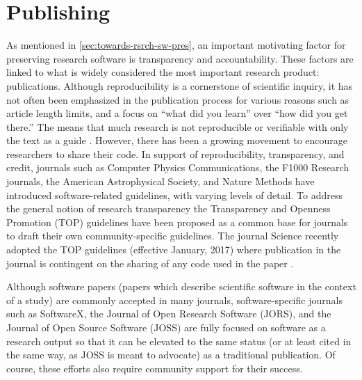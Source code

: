 \documentclass[letterpaper,11pt]{article}
\begin{document}
\section{Publishing}
As mentioned in \cref{sec:towards-rsrch-sw-pres}, an important motivating factor for preserving research software is transparency and accountability. These factors are linked to what is widely considered the most important research product: publications. Although reproducibility is a cornerstone of scientific inquiry, it has not often been emphasized in the publication process for various reasons such as article length limits, and a focus on ``what did you learn'' over ``how did you get there.'' The means that much research is not reproducible or verifiable with only the text as a guide \citep{stodden2014}. However, there has been a growing movement to encourage researchers to share their code. In support of reproducibility, transparency, and credit, journals such as Computer Physics Communications, the F1000 Research journals, the American Astrophysical Society, and Nature Methods have introduced software-related guidelines, with varying levels of detail. To address the general notion of research transparency the Transparency and Openness Promotion (TOP) guidelines \citep{nosek2015} have been proposed as a common base for journals to draft their own community-specific guidelines. The journal Science recently adopted the TOP guidelines (effective January, 2017) where publication in the journal is contingent on the sharing of any code used in the paper \citep{mcnutt2016}.

Although software papers (papers which describe scientific software in the context of a study) are commonly accepted in many journals, software-specific journals such as SoftwareX, the Journal of Open Research Software (JORS), and the Journal of Open Source Software (JOSS) are fully focused on software as a research output so that it can be elevated to the same status (or at least cited in the same way, as JOSS is meant to advocate) as a traditional publication. Of course, these efforts also require community support for their success.
\end{document}
